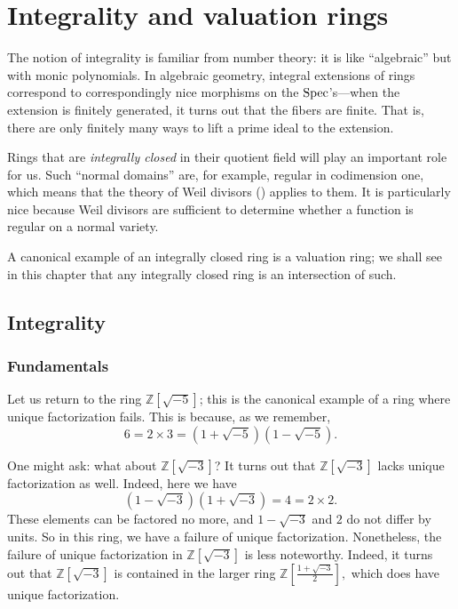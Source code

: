 \chapter{Integrality and valuation rings}
\label{intchapter}

The notion of integrality is familiar from number theory: it is like
``algebraic'' but with monic polynomials. In algebraic geometry, integral
extensions of rings correspond to correspondingly nice morphisms on the
$\operatorname{Spec}$'s---when the extension is finitely generated, it turns out that the
fibers are finite. That is, there are only finitely many ways to lift a prime
ideal to the extension.

Rings that are \emph{integrally closed} in their quotient field will play an
important role for us. Such ``normal domains'' are, for example, regular in
codimension one, which means that the theory of Weil divisors (\rref{}) applies
to them. It is particularly nice because Weil divisors are sufficient to
determine whether a function is regular on a normal variety.

A canonical example of an integrally closed ring is a valuation ring; we shall
see in this chapter that any integrally closed ring is an intersection of such.

\section{Integrality}

\subsection{Fundamentals}

Let us return to the ring $\mathbb{Z}[\sqrt{-5}]$; this is the canonical
example of a ring where unique factorization fails. This is because, as we
remember,
\[ 6 = 2 \times 3 = (1+\sqrt{-5})(1-\sqrt{-5}).  \]

One might ask: what about $\mathbb{Z}[\sqrt{-3}]$? It turns out that
$\mathbb{Z}[\sqrt{-3}]$ lacks unique factorization as well. Indeed, here we have
\[ (1 - \sqrt{-3})(1+\sqrt{-3}) = 4 = 2 \times 2.  \]
These elements can be factored no more, and $1 - \sqrt{-3}$ and $2$ do not
differ by units.
So in this ring, we have a failure of unique factorization. Nonetheless, the
failure of unique factorization in $\mathbb{Z}[\sqrt{-3}]$ is less
noteworthy. Indeed, it turns out that $\mathbb{Z}[\sqrt{-3}]$ is
contained in the larger ring
\( \mathbb{Z}\left[ \frac{1 + \sqrt{-3}}{2}\right],  \)
which does have unique factorization.


